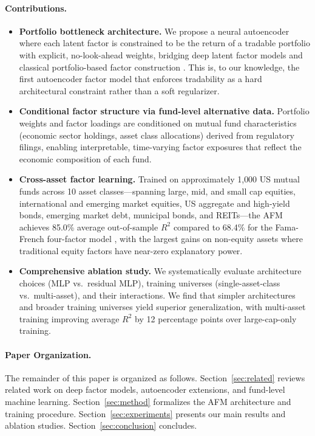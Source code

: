 \paragraph{Contributions.}
\begin{itemize}
    \item \textbf{Portfolio bottleneck architecture.} We propose a neural autoencoder where each latent factor is constrained to be the return of a tradable portfolio with explicit, no-look-ahead weights, bridging deep latent factor models \citep{GuKellyXiu2021autoencoder} and classical portfolio-based factor construction \citep{Huberman1987mimicking}. This is, to our knowledge, the first autoencoder factor model that enforces tradability as a hard architectural constraint rather than a soft regularizer.
    \item \textbf{Conditional factor structure via fund-level alternative data.} Portfolio weights and factor loadings are conditioned on mutual fund characteristics (economic sector holdings, asset class allocations) derived from regulatory filings, enabling interpretable, time-varying factor exposures that reflect the economic composition of each fund.
    \item \textbf{Cross-asset factor learning.} Trained on approximately 1{,}000 US mutual funds across 10 asset classes---spanning large, mid, and small cap equities, international and emerging market equities, US aggregate and high-yield bonds, emerging market debt, municipal bonds, and REITs---the AFM achieves 85.0\% average out-of-sample $R^2$ compared to 68.4\% for the Fama-French four-factor model \citep{FamaFrench2015fivefactor, Carhart1997persistence}, with the largest gains on non-equity assets where traditional equity factors have near-zero explanatory power.%
    \item \textbf{Comprehensive ablation study.} We systematically evaluate architecture choices (MLP vs.\ residual MLP), training universes (single-asset-class vs.\ multi-asset), and their interactions. We find that simpler architectures and broader training universes yield superior generalization, with multi-asset training improving average $R^2$ by 12 percentage points over large-cap-only training.%
\end{itemize}

\paragraph{Paper Organization.}
The remainder of this paper is organized as follows. Section~\ref{sec:related} reviews related work on deep factor models, autoencoder extensions, and fund-level machine learning. Section~\ref{sec:method} formalizes the AFM architecture and training procedure. Section~\ref{sec:experiments} presents our main results and ablation studies. Section~\ref{sec:conclusion} concludes.
